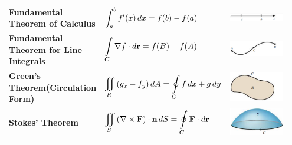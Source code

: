 \documentclass[../mathNotesPreamble]{subfiles}
\begin{document}
  \begin{center}
    \renewcommand{\arraystretch}{3}
    \begin{tabular}{@{}m{0.32\linewidth}m{0.4\linewidth}m{0.23\linewidth}@{}}\toprule
      \textbf{Fundamental Theorem of Calculus}& $\displaystyle\int_a^b f'(x)\,dx=f(b)-f(a)$& \includegraphics[width=\linewidth]{../images/briggs_17_08/tab17_04a}\\
      \textbf{Fundamental Theorem for Line Integrals}& $\displaystyle\int\limits_C \nabla f\cdot d{\mathbf{r}}=f(B)-f(A)$& \includegraphics[width=\linewidth]{../images/briggs_17_08/tab17_04b}\\
      \textbf{Green's Theorem\newline (Circulation Form)}& $\displaystyle\iint\limits_R {\left(g_x-f_y\right)}\,dA=\oint\limits_C f\,dx+g\,dy$& \includegraphics[width=\linewidth]{../images/briggs_17_08/tab17_04c}\\
      \textbf{Stokes' Theorem}& $\displaystyle\iint\limits_S {\left(\nabla\times\mathbf F\right)}\cdot{\mathbf{n}}\,dS=\oint\limits_C \mathbf F\cdot d{\mathbf{r}}$& \includegraphics[width=\linewidth]{../images/briggs_17_08/tab17_04d}\\

\end{tabular}
\end{center}
\end{document}
